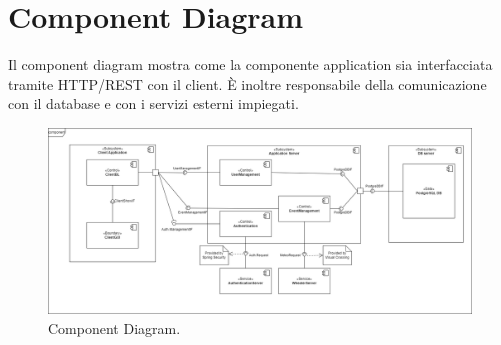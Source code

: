 \section{Component Diagram} 
Il component diagram mostra come la componente application sia interfacciata tramite HTTP/REST con il client. È inoltre responsabile 
della comunicazione con il database e con i servizi esterni impiegati.
\begin{figure}[h!]
	\centering
	\includegraphics[width=0.8\linewidth]{Iterazione 1/diagrammi/Component.drawio.png}
	\caption{Component Diagram.}
	\label{fig:ComponentDiagram}
\end{figure}
